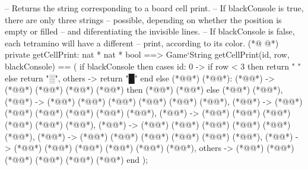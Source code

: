 \begin{vdmpp}[breaklines=true]
  -- Returns the string corresponding to a board cell print.
  -- If blackConsole is true, there are only three strings
  -- possible, depending on whether the position is empty or filled
  -- and diferentiating the invisible lines.
  -- If blackConsole is false, each tetramino will have a different
  -- print, according to its color.
(*@
\label{getCellPrint:82}
@*)
  private getCellPrint: nat * nat * bool ==> Game`String
  getCellPrint(id, row, blackConsole) == (
   if blackConsole then
    cases id:
     0 -> if row < 3 then return " " else return "░",
     others -> return "█"
    end
   else
    (*@@*) (*@@*):
     (*@@*) -> (*@@*) (*@@*) (*@\vdmnotcovered{<}@*) (*@@*) then (*@@*) (*@@*) else (*@@*) (*@@*),
     (*@@*) -> (*@@*) (*@\vdmnotcovered{"\textbackslash u001B[38;5;51m"}@*) (*@\vdmnotcovered{\^{}}@*) (*@@*) (*@\vdmnotcovered{\^{}}@*) (*@\vdmnotcovered{"\textbackslash u001B[0m"}@*),
     (*@@*) -> (*@@*) (*@\vdmnotcovered{"\textbackslash u001B[38;5;21m"}@*) (*@\vdmnotcovered{\^{}}@*) (*@@*) (*@\vdmnotcovered{\^{}}@*) (*@\vdmnotcovered{"\textbackslash u001B[0m"}@*),
     (*@@*) -> (*@@*) (*@\vdmnotcovered{"\textbackslash u001B[38;5;208m"}@*) (*@\vdmnotcovered{\^{}}@*) (*@@*) (*@\vdmnotcovered{\^{}}@*) (*@\vdmnotcovered{"\textbackslash u001B[0m"}@*),
     (*@@*) -> (*@@*) (*@\vdmnotcovered{"\textbackslash u001B[38;5;226m"}@*) (*@\vdmnotcovered{\^{}}@*) (*@@*) (*@\vdmnotcovered{\^{}}@*) (*@\vdmnotcovered{"\textbackslash u001B[0m"}@*),
     (*@@*) -> (*@@*) (*@\vdmnotcovered{"\textbackslash u001B[38;5;34m"}@*) (*@\vdmnotcovered{\^{}}@*) (*@@*) (*@\vdmnotcovered{\^{}}@*) (*@\vdmnotcovered{"\textbackslash u001B[0m"}@*),
     (*@@*) -> (*@@*) (*@\vdmnotcovered{"\textbackslash u001B[38;5;165m"}@*) (*@\vdmnotcovered{\^{}}@*) (*@@*) (*@\vdmnotcovered{\^{}}@*) (*@\vdmnotcovered{"\textbackslash u001B[0m"}@*),
     others -> (*@@*) (*@\vdmnotcovered{"\textbackslash u001B[38;5;196m"}@*) (*@\vdmnotcovered{\^{}}@*) (*@@*) (*@\vdmnotcovered{\^{}}@*) (*@\vdmnotcovered{"\textbackslash u001B[0m"}@*)    
    end
  );
  

\end{vdmpp}
